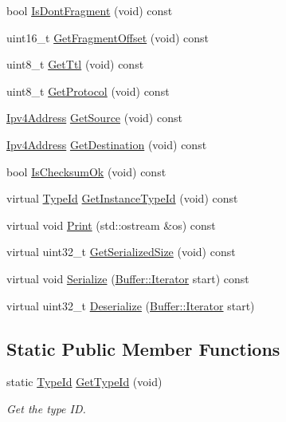 \begin{DoxyCompactItemize}
\item 
bool \hyperlink{classns3_1_1Ipv4Header_a55dda60f610e56f876bb702e713d9b63}{Is\+Dont\+Fragment} (void) const 
\item 
uint16\+\_\+t \hyperlink{classns3_1_1Ipv4Header_a243d60ad62409673f15783fb0b8a4f6f}{Get\+Fragment\+Offset} (void) const 
\item 
uint8\+\_\+t \hyperlink{classns3_1_1Ipv4Header_a7ca7a17f9749f92d65bb5e9d25972a53}{Get\+Ttl} (void) const 
\item 
uint8\+\_\+t \hyperlink{classns3_1_1Ipv4Header_a0d1e98db7295b31e301552155de24a91}{Get\+Protocol} (void) const 
\item 
\hyperlink{classns3_1_1Ipv4Address}{Ipv4\+Address} \hyperlink{classns3_1_1Ipv4Header_a350174921bb065f8f0e580d8b1dd4433}{Get\+Source} (void) const 
\item 
\hyperlink{classns3_1_1Ipv4Address}{Ipv4\+Address} \hyperlink{classns3_1_1Ipv4Header_a6723c42237bab47f74dd3a0123a9c6d1}{Get\+Destination} (void) const 
\item 
bool \hyperlink{classns3_1_1Ipv4Header_a3173c9be614c1f7c01d8834addac5ba9}{Is\+Checksum\+Ok} (void) const 
\item 
virtual \hyperlink{classns3_1_1TypeId}{Type\+Id} \hyperlink{classns3_1_1Ipv4Header_a2f748fd9b790c8182c2f040109eaa76e}{Get\+Instance\+Type\+Id} (void) const 
\item 
virtual void \hyperlink{classns3_1_1Ipv4Header_ab823da57c446e48a5689b0772ce0081e}{Print} (std\+::ostream \&os) const 
\item 
virtual uint32\+\_\+t \hyperlink{classns3_1_1Ipv4Header_a5bcd2cd5629c4818816be510bbd0d112}{Get\+Serialized\+Size} (void) const 
\item 
virtual void \hyperlink{classns3_1_1Ipv4Header_a09dd6e92cb94bc1287b5219519a7bc69}{Serialize} (\hyperlink{classns3_1_1Buffer_1_1Iterator}{Buffer\+::\+Iterator} start) const 
\item 
virtual uint32\+\_\+t \hyperlink{classns3_1_1Ipv4Header_a4c079e939ba868855ba1fab9e1b0e987}{Deserialize} (\hyperlink{classns3_1_1Buffer_1_1Iterator}{Buffer\+::\+Iterator} start)
\end{DoxyCompactItemize}
\subsection*{Static Public Member Functions}
\begin{DoxyCompactItemize}
\item 
static \hyperlink{classns3_1_1TypeId}{Type\+Id} \hyperlink{classns3_1_1Ipv4Header_a1a8be99f22ae53e7ad47298bb6d39e6f}{Get\+Type\+Id} (void)
\begin{DoxyCompactList}\small\item\em Get the type ID. \end{DoxyCompactList}\end{DoxyCompactItemize}
